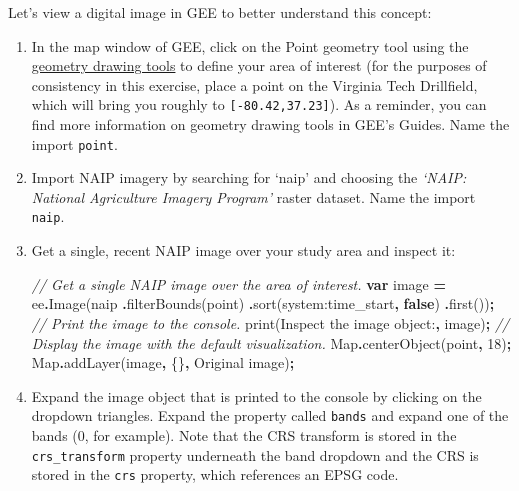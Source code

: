 \documentclass[
]{article}
\newenvironment{Shaded}{\begin{snugshade}}{\end{snugshade}}
\newcommand{\BuiltInTok}[1]{#1}
\newcommand{\CommentTok}[1]{\textcolor[rgb]{0.56,0.35,0.01}{\textit{#1}}}
\newcommand{\DecValTok}[1]{\textcolor[rgb]{0.00,0.00,0.81}{#1}}
\newcommand{\FunctionTok}[1]{\textcolor[rgb]{0.00,0.00,0.00}{#1}}
\newcommand{\KeywordTok}[1]{\textcolor[rgb]{0.13,0.29,0.53}{\textbf{#1}}}
\newcommand{\NormalTok}[1]{#1}
\newcommand{\OperatorTok}[1]{\textcolor[rgb]{0.81,0.36,0.00}{\textbf{#1}}}
\newcommand{\StringTok}[1]{\textcolor[rgb]{0.31,0.60,0.02}{#1}}
\begin{document}
Let's view a digital image in GEE to better understand this concept:

\begin{enumerate}
\def\labelenumi{\arabic{enumi}.}
\item
  In the map window of GEE, click on the Point geometry tool using the \href{https://developers.google.com/earth-engine/playground\#geometry-tools}{geometry drawing tools} to define your area of interest (for the purposes of consistency in this exercise, place a point on the Virginia Tech Drillfield, which will bring you roughly to
  \texttt{{[}-80.42,37.23{]}}). As a reminder, you can find more information on geometry drawing tools in GEE's Guides. Name the import \texttt{point}.
\item
  Import NAIP imagery by searching for `naip' and choosing the \emph{`NAIP: National Agriculture Imagery Program'} raster dataset. Name the import \texttt{naip}.
\item
  Get a single, recent NAIP image over your study area and inspect it:

\begin{Shaded}
\begin{Highlighting}[]
\CommentTok{//  Get a single NAIP image over the area of interest.  }
\KeywordTok{var}\NormalTok{  image }\OperatorTok{=}\NormalTok{ ee}\OperatorTok{.}\FunctionTok{Image}\NormalTok{(naip  }
                      \OperatorTok{.}\FunctionTok{filterBounds}\NormalTok{(point)}
                      \OperatorTok{.}\FunctionTok{sort}\NormalTok{(}\StringTok{\textquotesingle{}system:time\_start\textquotesingle{}}\OperatorTok{,} \KeywordTok{false}\NormalTok{)}
                      \OperatorTok{.}\FunctionTok{first}\NormalTok{())}\OperatorTok{;}      
\CommentTok{//  Print the image to the console.  }
\FunctionTok{print}\NormalTok{(}\StringTok{\textquotesingle{}Inspect the image object:\textquotesingle{}}\OperatorTok{,}\NormalTok{ image)}\OperatorTok{;}     
\CommentTok{//  Display the image with the default visualization.  }
\BuiltInTok{Map}\OperatorTok{.}\FunctionTok{centerObject}\NormalTok{(point}\OperatorTok{,} \DecValTok{18}\NormalTok{)}\OperatorTok{;}  
\BuiltInTok{Map}\OperatorTok{.}\FunctionTok{addLayer}\NormalTok{(image}\OperatorTok{,}\NormalTok{ \{\}}\OperatorTok{,} \StringTok{\textquotesingle{}Original image\textquotesingle{}}\NormalTok{)}\OperatorTok{;}
\end{Highlighting}
\end{Shaded}
\item
  Expand the image object that is printed to the console by clicking on the dropdown triangles. Expand the property called \texttt{bands} and expand one of the bands (0, for example). Note that the CRS transform is stored in the \texttt{crs\_transform} property underneath the band dropdown and the CRS is stored in the \texttt{crs} property, which references an EPSG code.


\end{enumerate}
\end{document}
